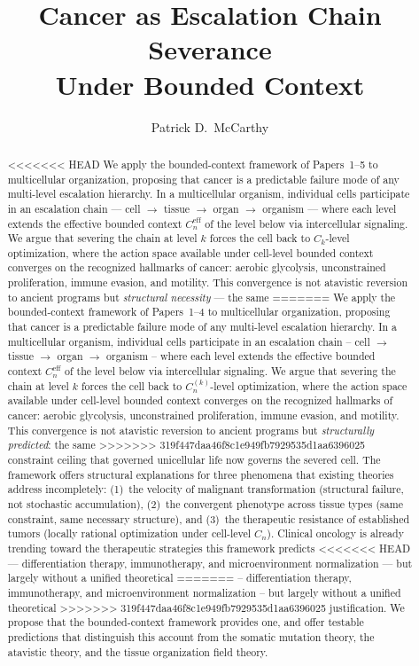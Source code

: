 \documentclass[11pt]{article}
\title{Cancer as Escalation Chain Severance\\Under Bounded Context}
\author{Patrick D.\ McCarthy}
\date{}
\theoremstyle{definition}
\theoremstyle{remark}
\begin{document}
\maketitle

\begin{abstract}
<<<<<<< HEAD
We apply the bounded-context framework of Papers~1--5 to
multicellular organization, proposing that cancer is a predictable
failure mode of any multi-level escalation hierarchy. In a
multicellular organism, individual cells participate in an escalation
chain --- cell $\to$ tissue $\to$ organ $\to$ organism --- where
each level extends the effective bounded context
$C_n^{\mathrm{eff}}$ of the level below via intercellular signaling.
We argue that severing the chain at level $k$ forces the cell back
to $C_k$-level optimization, where the action space available under
cell-level bounded context converges on the recognized hallmarks of
cancer: aerobic glycolysis, unconstrained proliferation, immune
evasion, and motility. This convergence is not atavistic reversion
to ancient programs but \emph{structural necessity} --- the same
=======
We apply the bounded-context framework of Papers~1--4 to
multicellular organization, proposing that cancer is a predictable
failure mode of any multi-level escalation hierarchy. In a
multicellular organism, individual cells participate in an escalation
chain -- cell $\to$ tissue $\to$ organ $\to$ organism -- where
each level extends the effective bounded context
$C_n^{\mathrm{eff}}$ of the level below via intercellular signaling.
We argue that severing the chain at level $k$ forces the cell back
to $C_n^{(k)}$-level optimization, where the action space available under
cell-level bounded context converges on the recognized hallmarks of
cancer: aerobic glycolysis, unconstrained proliferation, immune
evasion, and motility. This convergence is not atavistic reversion
to ancient programs but \emph{structurally predicted}: the same
>>>>>>> 319f447daa46f8c1e949fb7929535d1aa6396025
constraint ceiling that governed unicellular life now governs the
severed cell. The framework offers structural explanations for three
phenomena that existing theories address incompletely: (1)~the
velocity of malignant transformation (structural failure, not
stochastic accumulation), (2)~the convergent phenotype across tissue
types (same constraint, same necessary structure), and (3)~the
therapeutic resistance of established tumors (locally rational
optimization under cell-level $C_n$). Clinical oncology is already
trending toward the therapeutic strategies this framework predicts
<<<<<<< HEAD
--- differentiation therapy, immunotherapy, and microenvironment
normalization --- but largely without a unified theoretical
=======
-- differentiation therapy, immunotherapy, and microenvironment
normalization -- but largely without a unified theoretical
>>>>>>> 319f447daa46f8c1e949fb7929535d1aa6396025
justification. We propose that the bounded-context framework
provides one, and offer testable predictions that distinguish this
account from the somatic mutation theory, the atavistic theory, and
the tissue organization field theory.
\end{abstract}
\end{document}
